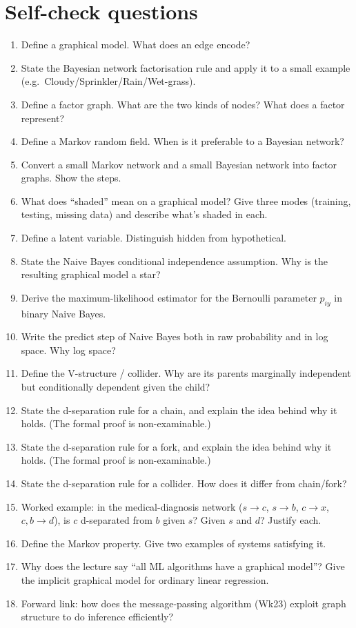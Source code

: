 \documentclass[11pt, a4paper]{article}
\begin{document}
\section*{Self-check questions}

\begin{enumerate}
  \item Define a graphical model. What does an edge encode?
  \item State the Bayesian network factorisation rule and apply it to a small example (e.g.\ Cloudy/Sprinkler/Rain/Wet-grass).
  \item Define a factor graph. What are the two kinds of nodes? What does a factor represent?
  \item Define a Markov random field. When is it preferable to a Bayesian network?
  \item Convert a small Markov network and a small Bayesian network into factor graphs. Show the steps.
  \item What does ``shaded'' mean on a graphical model? Give three modes (training, testing, missing data) and describe what's shaded in each.
  \item Define a latent variable. Distinguish hidden from hypothetical.
  \item State the Naive Bayes conditional independence assumption. Why is the resulting graphical model a star?
  \item Derive the maximum-likelihood estimator for the Bernoulli parameter $p_{iy}$ in binary Naive Bayes.
  \item Write the predict step of Naive Bayes both in raw probability and in log space. Why log space?
  \item Define the V-structure / collider. Why are its parents marginally independent but conditionally dependent given the child?
  \item State the d-separation rule for a chain, and explain the idea behind why it holds. (The formal proof is non-examinable.)
  \item State the d-separation rule for a fork, and explain the idea behind why it holds. (The formal proof is non-examinable.)
  \item State the d-separation rule for a collider. How does it differ from chain/fork?
  \item Worked example: in the medical-diagnosis network ($s \to c$, $s \to b$, $c \to x$, $c, b \to d$), is $c$ d-separated from $b$ given $s$? Given $s$ and $d$? Justify each.
  \item Define the Markov property. Give two examples of systems satisfying it.
  \item Why does the lecture say ``all ML algorithms have a graphical model''? Give the implicit graphical model for ordinary linear regression.
  \item Forward link: how does the message-passing algorithm (Wk23) exploit graph structure to do inference efficiently?
\end{enumerate}
\end{document}
